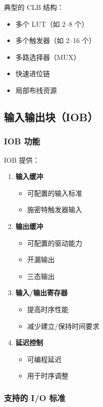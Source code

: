 典型的 CLB 结构：
\begin{itemize}
  \item 多个 LUT（如 2--8 个）
  \item 多个触发器（如 2--16 个）
  \item 多路选择器（MUX）
  \item 快速进位链
  \item 局部布线资源
\end{itemize}

\subsection{输入输出块（IOB）}

\subsubsection{IOB 功能}

IOB 提供：
\begin{enumerate}
  \item \textbf{输入缓冲}
    \begin{itemize}
      \item 可配置的输入标准
      \item 施密特触发器输入
    \end{itemize}

  \item \textbf{输出缓冲}
    \begin{itemize}
      \item 可配置的驱动能力
      \item 开漏输出
      \item 三态输出
    \end{itemize}

  \item \textbf{输入/输出寄存器}
    \begin{itemize}
      \item 提高时序性能
      \item 减少建立/保持时间要求
    \end{itemize}

  \item \textbf{延迟控制}
    \begin{itemize}
      \item 可编程延迟
      \item 用于时序调整
    \end{itemize}
\end{enumerate}

\subsubsection{支持的 I/O 标准}

